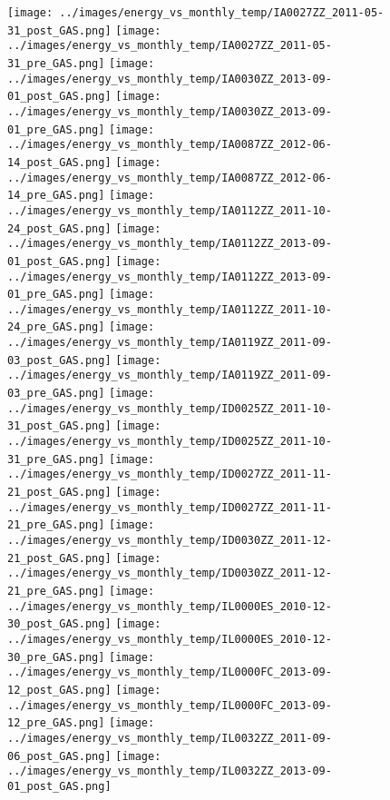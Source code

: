 \clearpage
\begin{figure}
\centering
\texttt{[image: ../images/energy\_vs\_monthly\_temp/IA0027ZZ\_2011-05-31\_post\_GAS.png]}
\texttt{[image: ../images/energy\_vs\_monthly\_temp/IA0027ZZ\_2011-05-31\_pre\_GAS.png]}
\texttt{[image: ../images/energy\_vs\_monthly\_temp/IA0030ZZ\_2013-09-01\_post\_GAS.png]}
\texttt{[image: ../images/energy\_vs\_monthly\_temp/IA0030ZZ\_2013-09-01\_pre\_GAS.png]}
\texttt{[image: ../images/energy\_vs\_monthly\_temp/IA0087ZZ\_2012-06-14\_post\_GAS.png]}
\texttt{[image: ../images/energy\_vs\_monthly\_temp/IA0087ZZ\_2012-06-14\_pre\_GAS.png]}
\texttt{[image: ../images/energy\_vs\_monthly\_temp/IA0112ZZ\_2011-10-24\_post\_GAS.png]}
\texttt{[image: ../images/energy\_vs\_monthly\_temp/IA0112ZZ\_2013-09-01\_post\_GAS.png]}
\texttt{[image: ../images/energy\_vs\_monthly\_temp/IA0112ZZ\_2013-09-01\_pre\_GAS.png]}
\texttt{[image: ../images/energy\_vs\_monthly\_temp/IA0112ZZ\_2011-10-24\_pre\_GAS.png]}
\texttt{[image: ../images/energy\_vs\_monthly\_temp/IA0119ZZ\_2011-09-03\_post\_GAS.png]}
\texttt{[image: ../images/energy\_vs\_monthly\_temp/IA0119ZZ\_2011-09-03\_pre\_GAS.png]}
\texttt{[image: ../images/energy\_vs\_monthly\_temp/ID0025ZZ\_2011-10-31\_post\_GAS.png]}
\texttt{[image: ../images/energy\_vs\_monthly\_temp/ID0025ZZ\_2011-10-31\_pre\_GAS.png]}
\texttt{[image: ../images/energy\_vs\_monthly\_temp/ID0027ZZ\_2011-11-21\_post\_GAS.png]}
\texttt{[image: ../images/energy\_vs\_monthly\_temp/ID0027ZZ\_2011-11-21\_pre\_GAS.png]}
\texttt{[image: ../images/energy\_vs\_monthly\_temp/ID0030ZZ\_2011-12-21\_post\_GAS.png]}
\texttt{[image: ../images/energy\_vs\_monthly\_temp/ID0030ZZ\_2011-12-21\_pre\_GAS.png]}
\texttt{[image: ../images/energy\_vs\_monthly\_temp/IL0000ES\_2010-12-30\_post\_GAS.png]}
\texttt{[image: ../images/energy\_vs\_monthly\_temp/IL0000ES\_2010-12-30\_pre\_GAS.png]}
\texttt{[image: ../images/energy\_vs\_monthly\_temp/IL0000FC\_2013-09-12\_post\_GAS.png]}
\texttt{[image: ../images/energy\_vs\_monthly\_temp/IL0000FC\_2013-09-12\_pre\_GAS.png]}
\texttt{[image: ../images/energy\_vs\_monthly\_temp/IL0032ZZ\_2011-09-06\_post\_GAS.png]}
\texttt{[image: ../images/energy\_vs\_monthly\_temp/IL0032ZZ\_2013-09-01\_post\_GAS.png]}
\end{figure}
